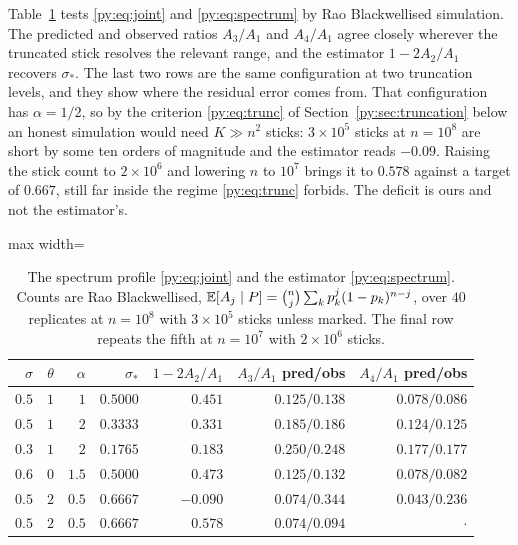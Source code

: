 Table~\ref{py:tab:joint} tests \eqref{py:eq:joint} and \eqref{py:eq:spectrum} by Rao Blackwellised
simulation. The predicted and observed ratios $A_3/A_1$ and $A_4/A_1$ agree closely wherever the
truncated stick resolves the relevant range, and the estimator $1-2A_2/A_1$ recovers $\sigma_*$.
The last two rows are the same configuration at two truncation levels, and they show where the
residual error comes from. That configuration has $\alpha = 1/2$, so by the criterion
\eqref{py:eq:trunc} of Section~\ref{py:sec:truncation} below an honest simulation would need
$K \gg n^{2}$ sticks: $3\times10^{5}$ sticks at $n = 10^{8}$ are short by
some ten orders of magnitude and the estimator reads $-0.09$. Raising the stick count to
$2\times10^{6}$ and lowering $n$ to $10^{7}$ brings it to $0.578$ against a target of $0.667$, still
far inside the regime \eqref{py:eq:trunc} forbids. The deficit is ours and not the estimator's.

\begin{table}[t]
\centering
\caption{The spectrum profile \eqref{py:eq:joint} and the estimator \eqref{py:eq:spectrum}. Counts are
Rao Blackwellised, $\mathbb{E}[A_j\mid P] = \binom{n}{j}\sum_k p_k^j(1-p_k)^{n-j}$, over $40$
replicates at $n = 10^{8}$ with $3\times10^{5}$ sticks unless marked. The final row repeats the
fifth at $n = 10^{7}$ with $2\times10^{6}$ sticks.}
\label{py:tab:joint}
\begin{adjustbox}{max width=\textwidth}
\begin{tabular}{rrrrrrr}
\toprule
$\sigma$ & $\theta$ & $\alpha$ & $\sigma_*$ & $1-2A_2/A_1$
& $A_3/A_1$ pred/obs & $A_4/A_1$ pred/obs\\
\midrule
$0.5$ & $1$ & $1$   & $0.5000$ & $0.451$ & $0.125/0.138$ & $0.078/0.086$\\
$0.5$ & $1$ & $2$   & $0.3333$ & $0.331$ & $0.185/0.186$ & $0.124/0.125$\\
$0.3$ & $1$ & $2$   & $0.1765$ & $0.183$ & $0.250/0.248$ & $0.177/0.177$\\
$0.6$ & $0$ & $1.5$ & $0.5000$ & $0.473$ & $0.125/0.132$ & $0.078/0.082$\\
$0.5$ & $2$ & $0.5$ & $0.6667$ & $-0.090$ & $0.074/0.344$ & $0.043/0.236$\\
$0.5$ & $2$ & $0.5$ & $0.6667$ & $0.578$ & $0.074/0.094$ & $\cdot$ \\
\bottomrule
\end{tabular}
\end{adjustbox}
\end{table}

